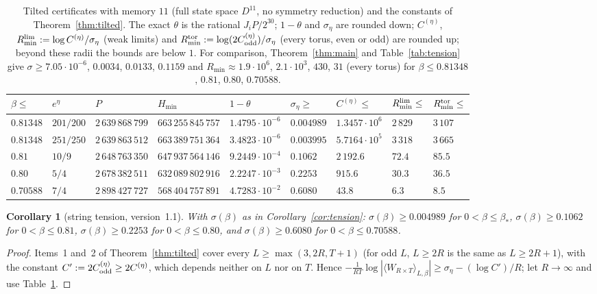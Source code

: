 \documentclass[11pt,a4paper]{article}
\theoremstyle{plain}
\newtheorem{corollary}[theorem]{Corollary}
\theoremstyle{remark}
\numberwithin{equation}{section}
\begin{document}
\begin{table}[ht]
\centering\footnotesize\setlength{\tabcolsep}{3.5pt}
\begin{tabular}{@{}lllllllll@{}}
\toprule
$\beta\le$ & $e^\eta$ & $P$ & $H_{\min}$ & $1-\theta$ & $\sigma_\eta\ge$ & $C^{(\eta)}\le$ & $R_{\min}^{\rm lim}\le$ & $R_{\min}^{\rm tor}\le$\\
\midrule
$0.81348$ & $201/200$ & $2\,639\,868\,799$ & $663\,255\,845\,757$ & $1.4795\cdot10^{-6}$ & $0.004989$ & $1.3457\cdot10^{6}$ & $2\,829$ & $3\,107$\\
$0.81348$ & $251/250$ & $2\,639\,863\,512$ & $663\,389\,751\,364$ & $3.4823\cdot10^{-6}$ & $0.003995$ & $5.7164\cdot10^{5}$ & $3\,318$ & $3\,665$\\
$0.81$ & $10/9$ & $2\,648\,763\,350$ & $647\,937\,564\,146$ & $9.2449\cdot10^{-4}$ & $0.1062$ & $2\,192.6$ & $72.4$ & $85.5$\\
$0.80$ & $5/4$ & $2\,678\,382\,511$ & $632\,089\,802\,916$ & $2.2247\cdot10^{-3}$ & $0.2253$ & $915.6$ & $30.3$ & $36.5$\\
$0.70588$ & $7/4$ & $2\,898\,427\,727$ & $568\,404\,757\,891$ & $4.7283\cdot10^{-2}$ & $0.6080$ & $43.8$ & $6.3$ & $8.5$\\
\bottomrule
\end{tabular}
\caption{Tilted certificates with memory $11$ (full state space $D^{11}$, no symmetry reduction) and the constants of
Theorem~\ref{thm:tilted}. The exact $\theta$ is the rational $J_iP/2^{30}$; $1-\theta$ and $\sigma_\eta$ are rounded down; $C^{(\eta)}$,
$R_{\min}^{\rm lim}:=\log C^{(\eta)}/\sigma_\eta$ (weak limits) and $R_{\min}^{\rm tor}:=\log(2C_{\rm odd}^{(\eta)})/\sigma_\eta$ (every torus,
even or odd) are rounded up; beyond these radii the bounds are below $1$. For comparison, Theorem~\ref{thm:main} and Table~\ref{tab:tension}
give $\sigma\ge7.05\cdot10^{-6}$, $0.0034$, $0.0133$, $0.1159$ and $R_{\min}\approx1.9\cdot10^{6}$, $2.1\cdot10^{3}$, $430$, $31$ (every torus) for
$\beta\le0.81348$, $0.81$, $0.80$, $0.70588$.}
\label{tab:tilted}
\end{table}

\begin{corollary}[string tension, version~1.1]\label{cor:tilted}
With $\sigma(\beta)$ as in Corollary~\ref{cor:tension}: $\sigma(\beta)\ge0.004989$ for $0<\beta\le\beta_*$, $\sigma(\beta)\ge0.1062$ for
$0<\beta\le0.81$, $\sigma(\beta)\ge0.2253$ for $0<\beta\le0.80$, and $\sigma(\beta)\ge0.6080$ for $0<\beta\le0.70588$.
\end{corollary}
\begin{proof}
Items~1 and~2 of Theorem~\ref{thm:tilted} cover every $L\ge\max(3,2R,T+1)$ (for odd $L$, $L\ge2R$ is the same as $L\ge2R+1$), with the
constant $C':=2C_{\rm odd}^{(\eta)}\ge2C^{(\eta)}$, which depends neither on $L$ nor on $T$. Hence
$-\frac1{RT}\log|\langle W_{R\times T}\rangle_{L,\beta}|\ge\sigma_\eta-(\log C')/R$; let $R\to\infty$ and use Table~\ref{tab:tilted}.
\end{proof}
\end{document}
